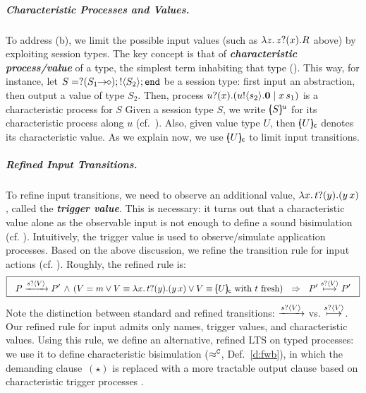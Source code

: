 \documentclass[a4paper,UKenglish]{lipics}
\theoremstyle{definition}
\begin{document}
\subparagraph{Characteristic Processes and Values.}
To address (b), we limit the possible 
input values (such as $\lambda z.\,z ? (x) . R$ above) %
by exploiting session types.
The key concept is that of {\bf \emph{characteristic process/value}}
of a type,  
the 
simplest term inhabiting that type ().
This way, for instance, let $S = ? (S_1\!\! \rightarrow\!\! \diamond) ; ! \langle S_2 \rangle ; \mathtt{end}$
be a session type: first
input an abstraction, %
then output a value of type $S_2$.
Then, process $u ? (x) . (u ! \langle s_2 \rangle . \mathbf{0} \;|\; x\, {s_1})$
is a characteristic process for $S$ 
Given a session type $S$, we write $[\!\!(S)\!\!]^{u} $
for its characteristic process along   $u$
(cf.~).
Also, %
given value type $U$, then
$[\!\!(U)\!\!]_{\mathsf{c}}$ denotes its characteristic value.
As we explain now, we use 
$[\!\!(U)\!\!]_{\mathsf{c}}$
 to limit input transitions.

\subparagraph{Refined Input Transitions.}
To refine  input transitions, we need to observe 
an additional value, 
$\lambda {x}.\,t ? (y) . (y\, {{x}})$, 
called the {\bf\em trigger value}. 
This is necessary: it turns out
that a characteristic value 
alone as the observable input 
is not enough to define a sound bisimulation (cf. ).
Intuitively, the trigger value is used
to observe/simulate application processes.
Based on the above discussion, we refine 
the transition rule for input actions (cf. ). 
Roughly, the 
refined
rule 
is:
$$
\boxed{
~~P \xrightarrow{s ? \langle V \rangle} P' \,\land\, (V = m \vee V \equiv \lambda {x}.\,t ? (y) . (y\, {{x}}) \vee  V \equiv [\!\!(U)\!\!]_{\mathsf{c}}  \textrm{ with } t \textrm{ fresh}) ~~\Rightarrow~~
P' \stackrel{s ? \langle V \rangle}{\longmapsto} P'~~}
$$
\noi
Note the distinction between standard and refined transitions: $\xrightarrow{s ? \langle V \rangle}$ vs. $\stackrel{s ? \langle V \rangle}{\longmapsto}$.
Our refined  rule for  input admits only names, trigger values, and characteristic values.
Using this rule, we define an alternative, refined  LTS on typed processes: 
we use it to define
characteristic  bisimulation 
($\approx^\mathtt{C}$, Def.~\ref{d:fwb}),
in which the demanding clause~$(\star)$ is replaced with 
a more tractable output clause based on 
characteristic 
trigger processes
.
\end{document}
